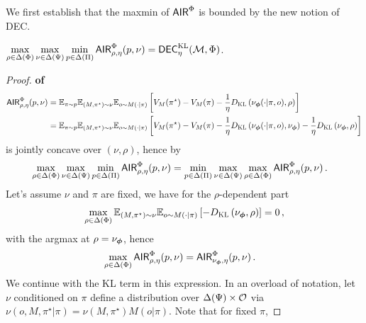 We first establish that the maxmin of $\mathsf{AIR}^\Phi$ is bounded by the new notion of DEC.
\begin{lemma} \label{lem: equivalence of dec}$\displaystyle\max_{\rho \in\Delta(\Phi)}\max_{\nu\in\Delta(\Psi)}\min_{p\in\Delta(\Pi)} \mathsf{AIR}^\Phi_{\rho,\eta}(p,\nu) = \mathsf{DEC}^{\textsc{KL}}_\eta (\mathcal{M}, \Phi)$. 
%
\end{lemma}
\begin{proof}\textbf{of \ \ }
\begin{align*}
    \air^\Phi_{\rho,\eta}(p,\nu) &= \E_{\pi\sim p} \E_{(M,\pi^\star)\sim \nu} \E_{o\sim M(\cdot|\pi)}\left[ V_{M}(\pi^\star) -  V_{M}(\pi) - \frac{1}{\eta} \KL\left( \nu_{\bo{\phi}}(\cdot|\pi, o), \rho\right) \right] 
        \\
        &= \E_{\pi\sim p} \E_{(M,\pi^\star)\sim \nu} \E_{o\sim M(\cdot|\pi)}\left[ V_{M}(\pi^\star) -  V_{M}(\pi) - \frac{1}{\eta} \KL\left( \nu_{\bo{\phi}}(\cdot|\pi, o), \nu_{\bo{\phi}}\right) - \frac{1}{\eta}\KL\left( \nu_{\bo{\phi}}, \rho\right)\right]
\end{align*}
is jointly concave over $(\nu,\rho)$, hence by 
\begin{align*}
    &\max_{\rho \in \Delta(\Phi)}\max_{\nu\in \Delta(\Psi)} \min_{p\in\Delta(\Pi)}\mathsf{AIR}^\Phi_{\rho,\eta}(p,\nu)
    =\min_{p\in\Delta(\Pi)}\max_{\nu\in \Delta(\Psi)}\max_{\rho \in \Delta(\Phi)} \mathsf{AIR}^\Phi_{\rho,\eta}(p,\nu)\,.
\end{align*}
Let's assume $\nu$ and $\pi$ are fixed, we have for the $\rho$-dependent part
\begin{align*}
    \max_{\rho \in \Delta(\Phi)} \E_{(M,\pi^\star)\sim \nu} \E_{o\sim M(\cdot|\pi)}\left[-\KL\left( \nu_{\bo{\phi}}, \rho\right)\right]=0\,,
\end{align*}
with the argmax at $\rho=\nu_{\bo{\phi}}$, hence
\begin{align*}
    &\max_{\rho \in \Delta(\Phi)} \air^\Phi_{\rho,\eta}(p,\nu)=\air^\Phi_{\nu_{\bo{\phi}},\eta}(p,\nu)\,.
\end{align*}
We continue with the KL term in this expression. In an overload of notation, let $\nu$ conditioned on $\pi$ define a distribution over $\Delta(\Psi)\times\mathcal{O}$ via $\nu(o,M,\pi^\star|\pi)=\nu(M,\pi^\star)M(o|\pi)$.
    Note that for fixed $\pi$, 

\end{proof}
